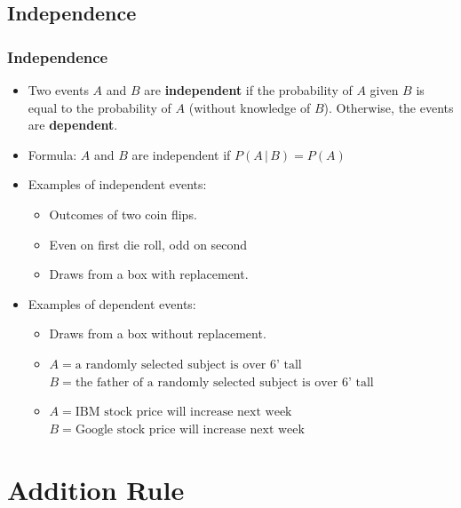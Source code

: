 \documentclass[t]{beamer}
\begin{document}
\subsection{Independence}
\begin{frame}[t]\frametitle{Independence}
{\small
\begin{itemize}
\item Two events $A$ and $B$ are 
    \textbf{independent} if the probability 
   of $A$ given $B$ is equal to the probability of $A$ (without
   knowledge of $B$).  Otherwise, the events are \textbf{dependent}.
\item Formula:  $A$ and $B$ are independent if $P(A\,\vert\,B)=P(A)$
\item Examples of independent events:%
   \begin{itemize}
    \item Outcomes of two coin flips.\\[2pt]
    \item Even on first die roll, odd on second\\[2pt]
    \item Draws from a box with replacement.
   \end{itemize}
\item Examples of dependent events:%
   \begin{itemize}
    \item Draws from a box without replacement.\\[3pt]
    \item $A=\mbox{a randomly selected subject is over 6' tall}$\\ $B=\mbox{the father of a randomly selected
      subject is over 6' tall}$\\[3pt]
    \item $A=\mbox{IBM stock price will increase next week}$\\ $B=\mbox{Google stock price will increase next week}$
   \end{itemize}
\end{itemize}
}
\end{frame}

\section{Addition Rule}
\end{document}
